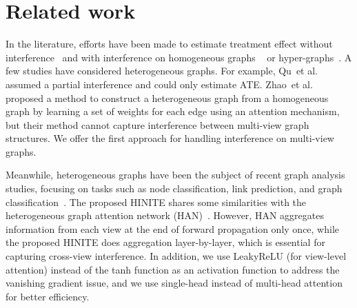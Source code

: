 \documentclass[runningheads]{llncs}
\newcommand{\etal}{{et al.}}
\begin{document}
\section{Related work}
In the literature, efforts have been made to estimate treatment effect without interference~\cite{chu2021graph,guo2020learning,Johansson2016,li2022deep,10.1093/biomet/70.1.41,rubin1980randomization,pmlr-v70-shalit17a,yao2021survey,NEURIPS2018_a50abba8} and with interference on homogeneous graphs ~\cite{Aronow2017EstimatingAC,doi:10.1080/01621459.2020.1768100,doi:10.1198/016214508000000292,liu2014large,pmlr-v130-ma21c,tchetgen2012causal,tchetgen2021auto,RePEc:arx:papers:1906.10258} or hyper-graphs~\cite{ma2022learning}. A few studies have considered heterogeneous graphs.
For example, Qu~\etal~\cite{qu2021efficient} assumed a partial interference and could only estimate ATE.
Zhao~\etal~\cite{zhao2022learning} proposed a method to construct a heterogeneous graph from a homogeneous graph by learning a set of weights for each edge using an attention mechanism, but their method cannot capture interference between multi-view graph structures. We offer the first approach for handling interference on multi-view graphs.

Meanwhile,  heterogeneous graphs have been the subject of recent graph analysis studies, focusing on tasks such as node classification, link prediction, and graph classification~\cite{fu2020magnn,jin2021heterogeneous,liang2022meta,shi2021entity,song2022self,wang2022survey,wang2019heterogeneous,zhang2019heterogeneous,zhao2021heterogeneous}. 
The proposed HINITE shares some similarities with the heterogeneous graph attention network (HAN)~\cite{wang2019heterogeneous}. However, HAN aggregates information from each view at the end of forward propagation only once, while the proposed HINITE does aggregation layer-by-layer, which is essential for capturing cross-view interference. In addition, we use LeakyReLU (for view-level attention) instead of the tanh function as an activation function to address the vanishing gradient issue, and we use single-head instead of multi-head attention for better efficiency.
\end{document}

